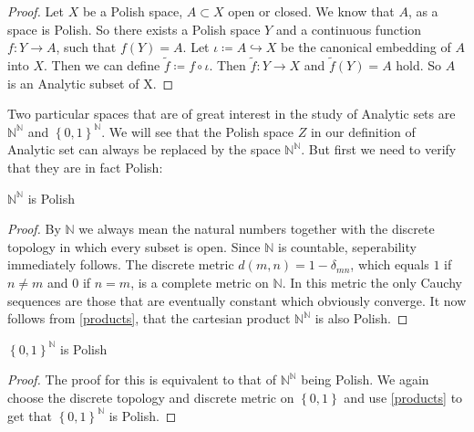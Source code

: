 \documentclass[10pt, a4paper, titlepage]{article}
\numberwithin{equation}{section}
\begin{document}
\begin{proof}
Let $X$ be a Polish space, $A \subset X$ open or closed.
We know that $A$, as a space is Polish. So there exists a Polish space $Y$ and a continuous function  $f:Y\to A$, such that  $f(Y) = A$. 
	Let $\iota  \coloneq A \hookrightarrow X$ be the canonical embedding of  $A$ into  $X$. 
	Then we can define  $\tilde{f}  \coloneq f \circ \iota$. Then  $\tilde{f}:Y \to X $ and  $\tilde{f}(Y) = A$ hold. So  $A$ is an Analytic subset of X.
\end{proof}

Two particular spaces that are of great interest in the study of Analytic sets are $\mathbb{N}^{\mathbb{N}}$ and $\left\{ 0,1 \right\}^{\mathbb{N}} $.
We will see that the Polish space $Z$ in our definition of Analytic set can always be replaced by the space $\mathbb{N}^{\mathbb{N}}$. But first we need to verify that they are in fact Polish:

\begin{theorem}
	$\mathbb{N}^\mathbb{N}$ is Polish
\end{theorem}
\begin{proof}
By $\mathbb{N}$ we always mean the natural numbers together with the discrete topology in which every subset is open. Since $\mathbb{N}$ is countable, seperability immediately follows.
The discrete metric $d\left( m,n \right) = 1 - \delta_{mn} $, which equals $1$ if  $n \neq m$ and $0$ if $n=m$, is a complete metric on  $\mathbb{N}$.
In this metric the only Cauchy sequences are those that are eventually constant which obviously converge.
It now follows from \ref{products}, that the cartesian product $\mathbb{N}^{\mathbb{N}}$ is also Polish.
\end{proof}

\begin{theorem}
	$\left\{ 0,1 \right\}^\mathbb{N}$ is Polish
\end{theorem}
\begin{proof}
	The proof for this is equivalent to that of $\mathbb{N}^{\mathbb{N}}$ being Polish. We again choose the discrete topology and discrete metric on $\left\{ 0,1 \right\} $ and use \ref{products} to get that $\left\{ 0,1 \right\} ^{\mathbb{N}} $ is Polish.	
\end{proof}
\end{document}
